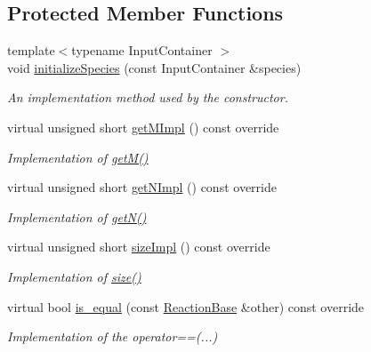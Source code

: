 \subsection*{Protected Member Functions}
\begin{DoxyCompactItemize}
\item 
{\footnotesize template$<$typename Input\-Container $>$ }\\void \hyperlink{classchem_1_1Reaction_a1c045e54c870a3e4cc0fb17b870d16f3}{initialize\-Species} (const Input\-Container \&species)
\begin{DoxyCompactList}\small\item\em An implementation method used by the constructor. \end{DoxyCompactList}\item 
virtual unsigned short \hyperlink{classchem_1_1Reaction_af3bdc92ce10377c7847855876e6d7875}{get\-M\-Impl} () const override
\begin{DoxyCompactList}\small\item\em Implementation of \hyperlink{classchem_1_1ReactionBase_a9b4f167efdd3307f0082c1e8e4ec537a}{get\-M()} \end{DoxyCompactList}\item 
virtual unsigned short \hyperlink{classchem_1_1Reaction_ad7170f4e147a955af31831007e9b90e9}{get\-N\-Impl} () const override
\begin{DoxyCompactList}\small\item\em Implementation of \hyperlink{classchem_1_1ReactionBase_ade08c8ab247efe988ebfe271b5876b98}{get\-N()} \end{DoxyCompactList}\item 
virtual unsigned short \hyperlink{classchem_1_1Reaction_a8457d6c276b11ed0d12a1ff2ef4f9f50}{size\-Impl} () const override
\begin{DoxyCompactList}\small\item\em Implementation of \hyperlink{classchem_1_1ReactionBase_a2d93483578ab0d29a2ec09920e7eeb94}{size()} \end{DoxyCompactList}\item 
virtual bool \hyperlink{classchem_1_1Reaction_a441aebc6e42ecd5e9bbf08a4523ed340}{is\-\_\-equal} (const \hyperlink{classchem_1_1ReactionBase}{Reaction\-Base} \&other) const override
\begin{DoxyCompactList}\small\item\em Implementation of the operator==(...) \end{DoxyCompactList}\item 

\end{DoxyCompactItemize}
